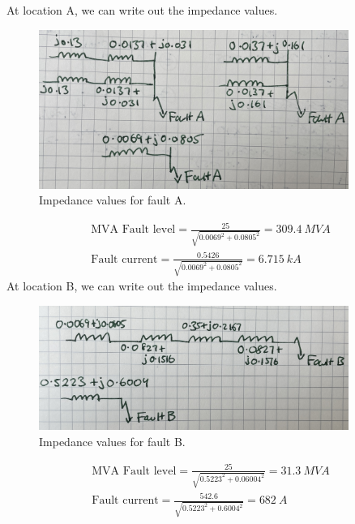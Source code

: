 At location A, we can write out the impedance values.
\begin{figure}[H]
    \centering
    \includegraphics[width = 0.9\textwidth]{img/figure19.jpg}
    \caption{Impedance values for fault A.}
    \label{fig:q5-1}
\end{figure}
\begin{gather}
    \textrm{MVA Fault level} = \frac{25}{\sqrt{0.0069^2 + 0.0805^2}} = \SI{309.4}{MVA}\\
    \textrm{Fault current} = \frac{0.5426}{\sqrt{0.0069^2 + 0.0805^2}} = \SI{6.715}{kA}
\end{gather}
At location B, we can write out the impedance values.
\begin{figure}[H]
    \centering
    \includegraphics[width = 0.9\textwidth]{img/figure20.jpg}
    \caption{Impedance values for fault B.}
    \label{fig:q5-2}
\end{figure}
\begin{gather}
    \textrm{MVA Fault level} = \frac{25}{\sqrt{0.5223^2 + 0.06004^2}} = \SI{31.3}{MVA}\\
    \textrm{Fault current} = \frac{542.6}{\sqrt{0.5223^2 + 0.6004^2}} = \SI{682}{A}
\end{gather}